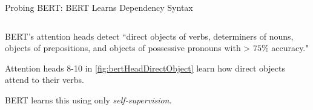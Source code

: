 \begin{frame}{Probing BERT: BERT Learns Dependency Syntax}
\begin{columns}
\begin{column}{0.4\textwidth}
            \begin{itemizeSpaced}{10pt}
            
            
                
                \pinkbox BERT's attention heads detect ``direct objects of verbs, determiners of nouns, objects of prepositions, and objects of possessive pronouns with > $75 \%$ accuracy."
                
                \item Attention heads 8-10 in \cref{fig:bertHeadDirectObject} learn how direct objects attend to their verbs. 
                
                \item BERT learns this using only \textit{self-supervision}. 
            \end{itemizeSpaced}
        \end{column}
    
    \end{columns}


\end{frame}





